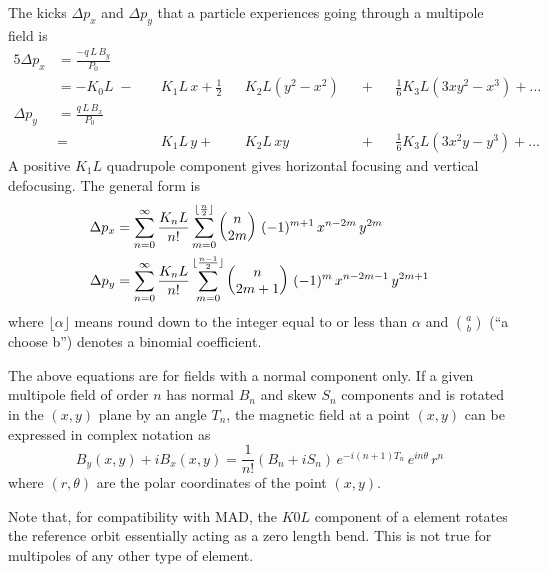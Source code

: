 The kicks $\Delta p_x$ and $\Delta p_y$ that a
particle experiences going through a multipole field is
\begin{alignat}{5}
  \Delta p_x & = \frac{-q \, L \, B_y}{P_0} \label{pqlbp1} \\
             & = -K_0 L \;-\; 
             && K_1 L \, x \plus 
             \frac{1}{2} && K_2 L (y^2 - x^2) && \plus 
             && \frac{1}{6} K_3 L (3x y^2 - x^3) \plus \ldots 
             \nonumber \\
  \Delta p_y & = \frac{q \, L \, B_x}{P_0} \label{pqlbp2} \\
             & =     
             && K_1 L \, y \plus 
             && K_2 L \, xy && \plus 
             && \frac{1}{6} K_3L (3x^2 y - y^3) \plus \ldots \nonumber 
\end{alignat}
A positive $K_1L$ quadrupole component gives
horizontal focusing and vertical defocusing. The general form is
\begin{align}
  \Delta p_x &= \sum_{n = 0}^{\infty} \frac{K_n L}{n!} 
             \sum_{m = 0}^{\lfloor \frac{n}{2} \rfloor}
             \begin{pmatrix} n \cr 2m \end{pmatrix} \,
             (-1)^{m+1} \, x^{n-2m} \, y^{2m} \\
  \Delta p_y &= \sum_{n = 0}^{\infty} \frac{K_n L}{n!} 
             \sum_{m = 0}^{\lfloor \frac{n-1}{2} \rfloor}
             \begin{pmatrix} n \cr 2m+1 \end{pmatrix} \,
             (-1)^{m} \, x^{n-2m-1} \, y^{2m+1}
\end{align}
where $\lfloor\alpha\rfloor$ means round down to the integer equal to or less than $\alpha$ and 
$\binom{a}{b}$ (``a choose b'') denotes a binomial coefficient.

The above equations are for fields with a normal component only. If a given multipole field of order $n$
has normal $B_n$ and skew $S_n$ components and is rotated in the $(x, y)$ plane by an angle $T_n$, the
magnetic field at a point $(x,y)$ can be expressed in complex notation as
\begin{equation}
  B_y(x,y) + i B_x(x,y) = 
    \frac{1}{n!} (B_n + i S_n) \, e^{-i(n+1)T_n} \, e^{i n \theta} \, r^n 
  \label{bib1nb}
\end{equation}
where $(r, \theta)$ are the polar coordinates of the point $(x, y)$.

Note that, for compatibility with MAD, the $K0L$ component of a  element rotates the
reference orbit essentially acting as a zero length bend. This is not true for multipoles of any
other type of element.

